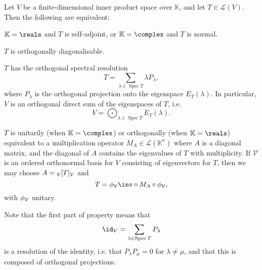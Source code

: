 \documentclass[a4paper, 11pt]{memoir}
\numberwithin{equation}{chapter}
\newcommand{\calL}{\mathcal{L}}
\newcommand{\calV}{\mathcal{V}}
\DeclareMathOperator{\spec}{Spec}
\begin{document}
\begin{theorem}
    \label{thm:spectral-theorem}
    Let $V$ be a finite-dimensional inner product space over $\mathbb{K}$, and let $T \in \calL(V)$. Then the following are equivalent:
    \begin{enumthm}
        \item \label{enum:spectral-selfadjoint-normal} $\mathbb{K} = \reals$ and $T$ is self-adjoint, or $\mathbb{K} = \complex$ and $T$ is normal.
        
        \item \label{enum:spectral-orthogonally-diagonalisable} $T$ is orthogonally diagonalisable.

        \item \label{enum:spectral-operator-decomposition} $T$ has the orthogonal spectral resolution
        \begin{equation*}
            T
                = \sum_{\lambda \in \spec T} \lambda P_\lambda,
        \end{equation*}
        where $P_\lambda$ is the orthogonal projection onto the eigenspace $E_T(\lambda)$. In particular, $V$ is an orthogonal direct sum of the eigenspaces of $T$, i.e.
        \begin{equation*}
            V
                = \bigodot_{\lambda \in \spec T} E_T(\lambda).
        \end{equation*}

        \item \label{enum:spectral-multiplication-operator} $T$ is unitarily (when $\mathbb{K} = \complex$) or orthogonally (when $\mathbb{K} = \reals$) equivalent to a multiplication operator $M_A \in \calL(\mathbb{K}^n)$ where $A$ is a diagonal matrix, and the diagonal of $A$ contains the eigenvalues of $T$ with multiplicity. If $\calV$ is an ordered orthonormal basis for $V$ consisting of eigenvectors for $T$, then we may choose $A = \mr{\calV}{T}{\calV}$ and
        \begin{equation*}
            T
                = \coordmap{\calV}\inv \circ M_A \circ \coordmap{\calV},
        \end{equation*}
        with $\coordmap{\calV}$ unitary.
    \end{enumthm}
\end{theorem}
%
Note that the first part of property  means that
%
\begin{equation*}
    \id_V
        = \sum_{\lambda \in \spec T} P_\lambda
\end{equation*}
%
is a resolution of the identity, i.e. that $P_\lambda P_\mu = 0$ for $\lambda \neq \mu$, and that this is composed of orthogonal projections.
\end{document}
